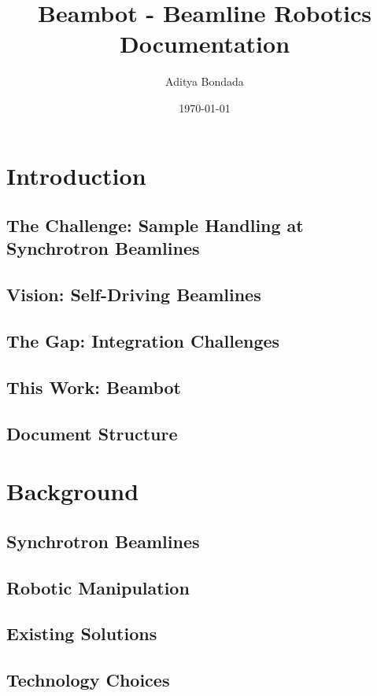 \documentclass[12pt, a4paper]{article}
\title{Beambot - Beamline Robotics Documentation}
\author{Aditya Bondada}
\date{\today}
\begin{document}
\maketitle

\section{Introduction}

\subsection{The Challenge: Sample Handling at Synchrotron Beamlines}

\subsection{Vision: Self-Driving Beamlines}

\subsection{The Gap: Integration Challenges}

\subsection{This Work: Beambot}

\subsection{Document Structure}

\section{Background}

\subsection{Synchrotron Beamlines}

\subsection{Robotic Manipulation}

\subsection{Existing Solutions}

\subsection{Technology Choices}
\end{document}
